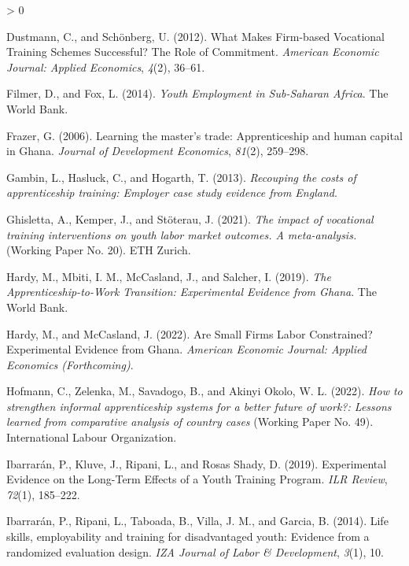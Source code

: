 \documentclass[
  11pt,
a4paper
]{article}
\newlength{\cslhangindent}
\newenvironment{CSLReferences}[2] %
 {%
  \setlength{\parindent}{0pt}
  \ifodd #1 \everypar{\setlength{\hangindent}{\cslhangindent}}\ignorespaces\fi
  \ifnum #2 > 0
  \setlength{\parskip}{#2\baselineskip}
  \fi
 }%
 {}
\begin{document}
\begin{CSLReferences}{1}{0}
\leavevmode\hypertarget{ref-dustmann2012}{}%
Dustmann, C., and Schönberg, U. (2012). What {Makes Firm-based Vocational Training Schemes Successful}? {The Role} of {Commitment}. \emph{American Economic Journal: Applied Economics}, \emph{4}(2), 36--61.

\leavevmode\hypertarget{ref-filmer2014}{}%
Filmer, D., and Fox, L. (2014). \emph{Youth {Employment} in {Sub-Saharan Africa}}. {The World Bank}.

\leavevmode\hypertarget{ref-frazer2006}{}%
Frazer, G. (2006). Learning the master's trade: {Apprenticeship} and human capital in {Ghana}. \emph{Journal of Development Economics}, \emph{81}(2), 259--298.

\leavevmode\hypertarget{ref-gambinlynn2013}{}%
Gambin, L., Hasluck, C., and Hogarth, T. (2013). \emph{Recouping the costs of apprenticeship training: Employer case study evidence from {England}}.

\leavevmode\hypertarget{ref-ghisletta2021}{}%
Ghisletta, A., Kemper, J., and Stöterau, J. (2021). \emph{The impact of vocational training interventions on youth labor market outcomes. {A} meta-analysis.} (Working Paper No. 20). {ETH Zurich}.

\leavevmode\hypertarget{ref-hardy2019}{}%
Hardy, M., Mbiti, I. M., McCasland, J., and Salcher, I. (2019). \emph{The {Apprenticeship-to-Work Transition}: {Experimental Evidence} from {Ghana}}. {The World Bank}.

\leavevmode\hypertarget{ref-hardy2022}{}%
Hardy, M., and McCasland, J. (2022). Are {Small Firms Labor Constrained}? {Experimental Evidence} from {Ghana}. \emph{American Economic Journal: Applied Economics (Forthcoming)}.

\leavevmode\hypertarget{ref-hofmann2022}{}%
Hofmann, C., Zelenka, M., Savadogo, B., and Akinyi Okolo, W. L. (2022). \emph{How to strengthen informal apprenticeship systems for a better future of work?: {Lessons} learned from comparative analysis of country cases} (Working Paper No. 49). {International Labour Organization}.

\leavevmode\hypertarget{ref-ibarraran2019}{}%
Ibarrarán, P., Kluve, J., Ripani, L., and Rosas Shady, D. (2019). Experimental {Evidence} on the {Long-Term Effects} of a {Youth Training Program}. \emph{ILR Review}, \emph{72}(1), 185--222.

\leavevmode\hypertarget{ref-ibarraran2014}{}%
Ibarrarán, P., Ripani, L., Taboada, B., Villa, J. M., and Garcia, B. (2014). Life skills, employability and training for disadvantaged youth: {Evidence} from a randomized evaluation design. \emph{IZA Journal of Labor \& Development}, \emph{3}(1), 10.


\end{CSLReferences}
\end{document}
